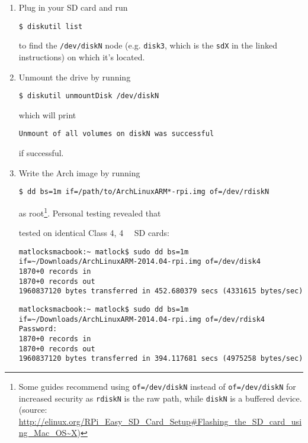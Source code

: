 \documentclass[12pt,letterpaper]{article}
\begin{document}
\begin{enumerate}
\item Plug in your SD card and run

\begin{lstlisting}
$ diskutil list
\end{lstlisting}

to find the \lstinline{/dev/diskN} node (e.g. \lstinline{disk3}, which is the \lstinline{sdX} in the linked instructions) on which it's located.

\item Unmount the drive by running

\begin{lstlisting}
$ diskutil unmountDisk /dev/diskN
\end{lstlisting}

which will print

\begin{lstlisting}
Unmount of all volumes on diskN was successful
\end{lstlisting}

if successful.

\item Write the Arch image by running

\begin{lstlisting}
$ dd bs=1m if=/path/to/ArchLinuxARM*-rpi.img of=/dev/rdiskN
\end{lstlisting}
as root\footnote{Some guides recommend using \lstinline{of=/dev/diskN} instead of \lstinline{of=/dev/diskN} for increased security as \lstinline{rdiskN} is the raw path, while \lstinline{diskN} is a buffered device. (source: %
\url{http://elinux.org/RPi_Easy_SD_Card_Setup\#Flashing_the_SD_card_using_Mac_OS~X}) }. %
Personal testing revealed that

tested on identical Class 4, \SI{4}{\giga\byte} SD cards:
\begin{lstlisting}
matlocksmacbook:~ matlock$ sudo dd bs=1m if=~/Downloads/ArchLinuxARM-2014.04-rpi.img of=/dev/disk4
1870+0 records in
1870+0 records out
1960837120 bytes transferred in 452.680379 secs (4331615 bytes/sec)
\end{lstlisting}

\begin{lstlisting}
matlocksmacbook:~ matlock$ sudo dd bs=1m if=~/Downloads/ArchLinuxARM-2014.04-rpi.img of=/dev/rdisk4
Password:
1870+0 records in
1870+0 records out
1960837120 bytes transferred in 394.117681 secs (4975258 bytes/sec)
\end{lstlisting}

\end{enumerate}
\end{document}

